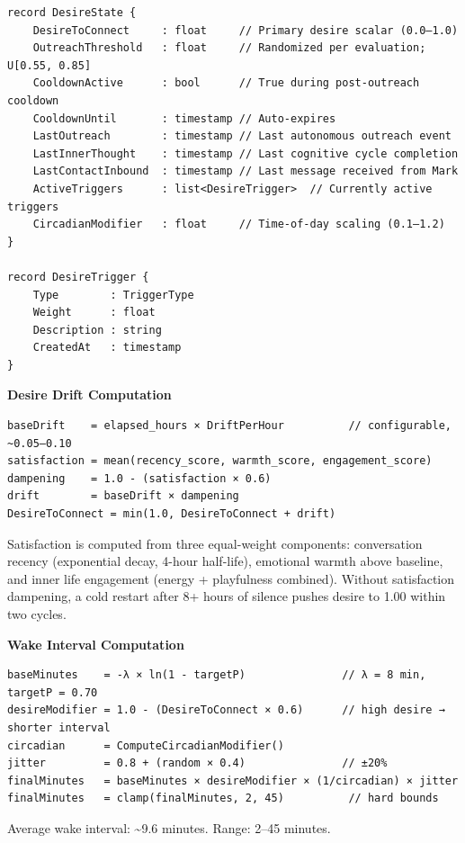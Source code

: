 \begin{verbatim}
record DesireState {
    DesireToConnect     : float     // Primary desire scalar (0.0–1.0)
    OutreachThreshold   : float     // Randomized per evaluation; U[0.55, 0.85]
    CooldownActive      : bool      // True during post-outreach cooldown
    CooldownUntil       : timestamp // Auto-expires
    LastOutreach        : timestamp // Last autonomous outreach event
    LastInnerThought    : timestamp // Last cognitive cycle completion
    LastContactInbound  : timestamp // Last message received from Mark
    ActiveTriggers      : list<DesireTrigger>  // Currently active triggers
    CircadianModifier   : float     // Time-of-day scaling (0.1–1.2)
}

record DesireTrigger {
    Type        : TriggerType
    Weight      : float
    Description : string
    CreatedAt   : timestamp
}
\end{verbatim}

\textbf{Desire Drift Computation}

\begin{verbatim}
baseDrift    = elapsed_hours × DriftPerHour          // configurable, ~0.05–0.10
satisfaction = mean(recency_score, warmth_score, engagement_score)
dampening    = 1.0 - (satisfaction × 0.6)
drift        = baseDrift × dampening
DesireToConnect = min(1.0, DesireToConnect + drift)
\end{verbatim}

Satisfaction is computed from three equal-weight components:
conversation recency (exponential decay, 4-hour half-life), emotional
warmth above baseline, and inner life engagement (energy + playfulness
combined). Without satisfaction dampening, a cold restart after 8+ hours
of silence pushes desire to 1.00 within two cycles.

\textbf{Wake Interval Computation}

\begin{verbatim}
baseMinutes    = -λ × ln(1 - targetP)               // λ = 8 min, targetP = 0.70
desireModifier = 1.0 - (DesireToConnect × 0.6)      // high desire → shorter interval
circadian      = ComputeCircadianModifier()
jitter         = 0.8 + (random × 0.4)               // ±20%
finalMinutes   = baseMinutes × desireModifier × (1/circadian) × jitter
finalMinutes   = clamp(finalMinutes, 2, 45)          // hard bounds
\end{verbatim}

Average wake interval: \textasciitilde9.6 minutes. Range: 2--45 minutes.

